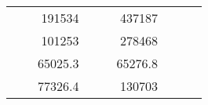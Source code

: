 \begin{table}[H]
\begin{tabular}{|ccrccrccc}
\multicolumn{1}{|c|}{\cellcolor[HTML]{FFFFC7}}                                & \multicolumn{1}{c|}{\cellcolor[HTML]{DDFDFF}}                      & \multicolumn{1}{r|}{\cellcolor[HTML]{DAE8FC}191534}    & \multicolumn{1}{c|}{\cellcolor[HTML]{FFFFC7}}                                & \multicolumn{1}{c|}{\cellcolor[HTML]{DDFDFF}}                       & \multicolumn{1}{r|}{\cellcolor[HTML]{DDFDFF}437187}    &                                                                              &                                                                    &                                                        \\ \cline{3-3} \cline{6-6}
\multicolumn{1}{|c|}{\cellcolor[HTML]{FFFFC7}}                                & \multicolumn{1}{c|}{\cellcolor[HTML]{DDFDFF}}                      & \multicolumn{1}{r|}{\cellcolor[HTML]{DDFDFF}101253}    & \multicolumn{1}{c|}{\cellcolor[HTML]{FFFFC7}}                                & \multicolumn{1}{c|}{\cellcolor[HTML]{DDFDFF}}                       & \multicolumn{1}{r|}{\cellcolor[HTML]{DAE8FC}278468}    &                                                                              &                                                                    &                                                        \\ \cline{3-3} \cline{6-6}
\multicolumn{1}{|c|}{\cellcolor[HTML]{FFFFC7}}                                & \multicolumn{1}{c|}{\cellcolor[HTML]{DDFDFF}}                      & \multicolumn{1}{r|}{\cellcolor[HTML]{DAE8FC}65025.3}   & \multicolumn{1}{c|}{\cellcolor[HTML]{FFFFC7}}                                & \multicolumn{1}{c|}{\cellcolor[HTML]{DDFDFF}}                       & \multicolumn{1}{r|}{\cellcolor[HTML]{DDFDFF}65276.8}   &                                                                              &                                                                    &                                                        \\ \cline{3-3} \cline{6-6}
\multicolumn{1}{|c|}{\cellcolor[HTML]{FFFFC7}}                                & \multicolumn{1}{c|}{\cellcolor[HTML]{DDFDFF}}                      & \multicolumn{1}{r|}{\cellcolor[HTML]{DDFDFF}77326.4}   & \multicolumn{1}{c|}{\cellcolor[HTML]{FFFFC7}}                                & \multicolumn{1}{c|}{\cellcolor[HTML]{DDFDFF}}                       & \multicolumn{1}{r|}{\cellcolor[HTML]{DAE8FC}130703}    &                                                                              &                                                                    &                                                        \\ \cline{3-3} \cline{6-6}

\end{tabular}
\end{table}
